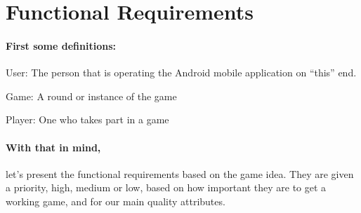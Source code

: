 \section{Functional Requirements}
\paragraph{First some definitions:} 
\begin{description}
\item{User:} The person that is operating the Android mobile application on ``this'' end.
\item{Game:} A round or instance of the game 
\item{Player:} One who takes part in a game
\end{description}

\paragraph{With that in mind,} let's present the functional requirements based on the game idea. They are given a priority, high, medium or low, based on how important they are to get a working game, and for our main quality attributes.

